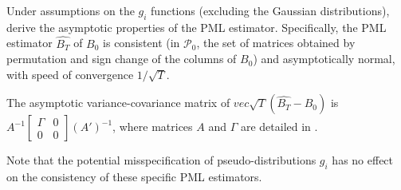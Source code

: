 \documentclass[
  12pt,
]{book}
\theoremstyle{definition}
\theoremstyle{definition}
\theoremstyle{definition}
\theoremstyle{definition}
\theoremstyle{remark}
\begin{document}
Under assumptions on the \(g_i\) functions (excluding the Gaussian distributions), \citet{Gourieroux_Monfort_Renne_2017} derive the asymptotic properties of the PML estimator. Specifically, the PML estimator \(\widehat{B_T}\) of \(B_0\) is consistent (in \(\mathcal{P}_0\), the set of matrices obtained by permutation and sign change of the columns of \(B_0\)) and asymptotically normal, with speed of convergence \(1/\sqrt{T}\).

The asymptotic variance-covariance matrix of \(vec \sqrt{T} (\widehat{B_T} - B_0)\) is \(A^{-1} \left[\begin{array}{cc} \Gamma & 0 \\ 0 & 0 \end{array} \right] (A')^{-1}\), where matrices \(A\) and \(\Gamma\) are detailed in \citet{Gourieroux_Monfort_Renne_2017}.

Note that the potential misspecification of pseudo-distributions \(g_i\) has no effect on the consistency of these specific PML estimators.
\end{document}
